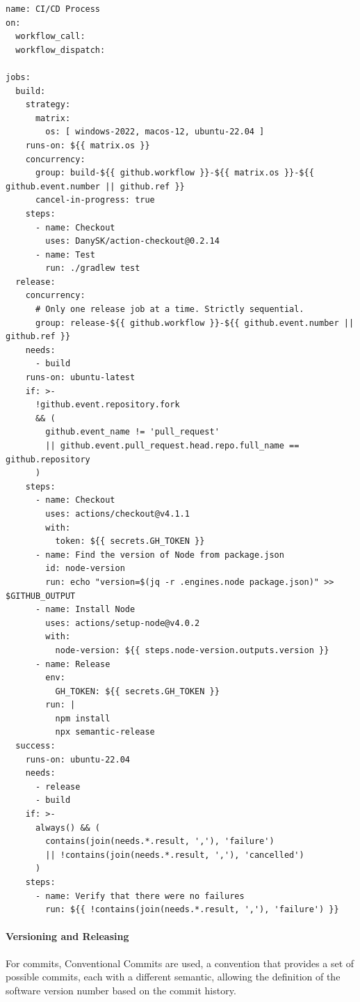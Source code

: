 \documentclass[12pt,a4paper,openright,twoside]{book}
\begin{document}
\begin{lstlisting}[style=yaml]
  name: CI/CD Process
on:
  workflow_call:
  workflow_dispatch:

jobs:
  build:
    strategy:
      matrix:
        os: [ windows-2022, macos-12, ubuntu-22.04 ]
    runs-on: ${{ matrix.os }}
    concurrency:
      group: build-${{ github.workflow }}-${{ matrix.os }}-${{ github.event.number || github.ref }}
      cancel-in-progress: true
    steps:
      - name: Checkout
        uses: DanySK/action-checkout@0.2.14
      - name: Test
        run: ./gradlew test
  release:
    concurrency:
      # Only one release job at a time. Strictly sequential.
      group: release-${{ github.workflow }}-${{ github.event.number || github.ref }}
    needs:
      - build
    runs-on: ubuntu-latest
    if: >-
      !github.event.repository.fork
      && (
        github.event_name != 'pull_request'
        || github.event.pull_request.head.repo.full_name == github.repository
      )
    steps:
      - name: Checkout
        uses: actions/checkout@v4.1.1
        with:
          token: ${{ secrets.GH_TOKEN }}
      - name: Find the version of Node from package.json
        id: node-version
        run: echo "version=$(jq -r .engines.node package.json)" >> $GITHUB_OUTPUT
      - name: Install Node
        uses: actions/setup-node@v4.0.2
        with:
          node-version: ${{ steps.node-version.outputs.version }}
      - name: Release
        env:
          GH_TOKEN: ${{ secrets.GH_TOKEN }}
        run: |
          npm install
          npx semantic-release
  success:
    runs-on: ubuntu-22.04
    needs:
      - release
      - build
    if: >-
      always() && (
        contains(join(needs.*.result, ','), 'failure')
        || !contains(join(needs.*.result, ','), 'cancelled')
      )
    steps:
      - name: Verify that there were no failures
        run: ${{ !contains(join(needs.*.result, ','), 'failure') }}
\end{lstlisting}

\paragraph*{Versioning and Releasing}
For commits, Conventional Commits are used, a convention that provides a set of possible commits, 
each with a different semantic, allowing the definition of the software version number based on the commit history.
\end{document}
